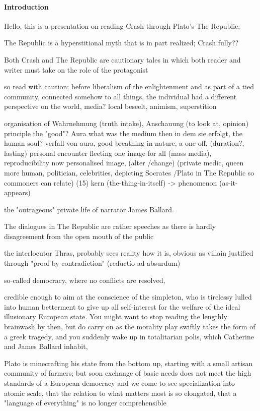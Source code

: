 \documentclass{article}
\begin{document}
\paragraph{Introduction} 
Hello, this is a presentation on reading Crash through Plato's The Republic; 

The Republic is a hyperstitional myth that is in part realized; 
Crash fully??


Both Crash and The Republic are cautionary tales 
in which both reader and writer must 
take on the role of the protagonist

so read with caution; 
before liberalism of the enlightenment 
and as part of a tied community, 
connected somehow to all things, 
the individual had a different perspective on the world, media?
local
beseelt, animism, 
superstition


organisation of Wahrnehmung (truth intake), Anschauung (to look at, opinion) 
principle the "good"? Aura
what was the medium then in dem sie erfolgt, the human soul?
verfall von aura, good
breathing in nature, a one-off, (duration?, lasting) personal encounter
fleeting one image for all (mass media), reproducibility
now personalised image, (alter /change)
(private medic, queen more human, politician, celebrities, depicting Socrates /Plato in The Republic so commoners can relate)
(15) kern (the-thing-in-itself) -> phenomenon (as-it-appears)


the "outrageous" private life of narrator James Ballard.


The dialogues in The Republic are rather speeches
as there is hardly disagreement from the open mouth of the public

the interlocutor Thras, probably sees reality how it is, 
obvious as villain 
justified through "proof by contradiction" (reductio ad absurdum)

so-called democracy, where no conflicts are resolved, 


credible enough to aim at the conscience of the simpleton, 
who is tirelessy lulled into human betterment to 
give up all self-interest for the welfare of the ideal illusionary European state.
You might want to stop reading the lengthly brainwash
by then, but do carry on as the morality play swiftly 
takes the form of a greek tragedy,  
and you suddenly wake up in totalitarian polis, 
which Catherine and James Ballard inhabit, 

Plato is minecrafting his state from the bottom up, 
starting with a small artisan community of farmers; 
but soon exchange of basic needs does not meet the 
high standards of a European democracy 
and we come to see specialization into atomic scale, that
the relation to what matters most is so elongated,
that a "language of everything" is no longer comprehensible
\end{document}
